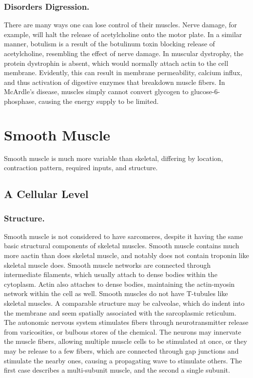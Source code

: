 \documentclass[12pt]{report}
\begin{document}
\subsubsection{Disorders Digression.}
There are many ways one can lose control of their muscles. Nerve damage, for example, will halt the release of acetylcholine onto the motor plate. In a similar manner, botulism is a result of the botulinum toxin blocking release of acetylcholine, resembling the effect of nerve damage. In muscular dystrophy, the protein dystrophin is absent, which would normally attach actin to the cell membrane. Evidently, this can result in membrane permeability, calcium influx, and thus activation of digestive enzymes that breakdown muscle fibers. In McArdle's disease, muscles simply cannot convert glycogen to glucose-6-phosphase, causing the energy supply to be limited. 


\section{Smooth Muscle}

Smooth muscle is much more variable than skeletal, differing by location, contraction pattern, required inputs, and structure. 


\subsection{A Cellular Level}
\subsubsection{Structure.}
Smooth muscle is not considered to have sarcomeres, despite it having the same basic structural components of skeletal muscles. Smooth muscle contains much more aactin than does skeletal muscle, and notably does not contain troponin like skeletal muscle does. Smooth muscle networks are connected through intermediate filaments, which usually attach to dense bodies within the cytoplasm. Actin also attaches to dense bodies, maintaining the actin-myosin network within the cell as well. Smooth muscles do not have T-tubules like skeletal muscles. A comparable structure may be calveolae, which do indent into the membrane and seem spatially associated with the sarcoplasmic reticulum. The autonomic nervous system stimulates fibers through neurotransmitter release from varicosities, or bulbous stores of the chemical. The neurons may innervate the muscle fibers, allowing multiple muscle cells to be stimulated at once, or they may be release to a few fibers, which are connected through gap junctions and stimulate the nearby ones, causing a propagating wave to stimulate others. The first case describes a multi-subunit muscle, and the second a single subunit. 
\end{document}
